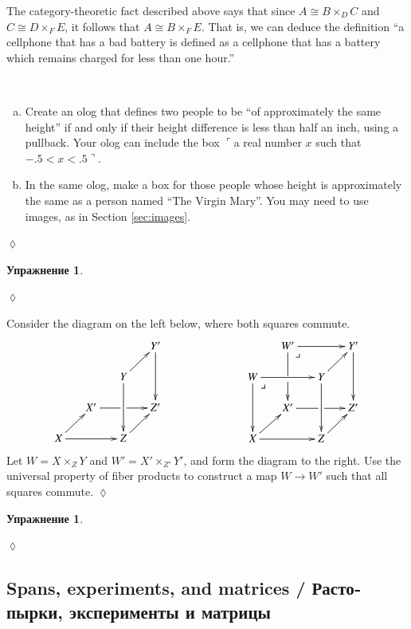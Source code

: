 \documentclass[a4paper]{book}
\makeatletter
\def\tn{\textnormal}
\def\to{\rightarrow}
\def\iso{\cong}
\newcommand{\fakebox}[1]{\tn{$\ulcorner$#1$\urcorner$}}
\def\ullimit{\ar@{}[rd]|(.3)*+{\lrcorner}}
\theoremstyle{myth}
\newtheorem{excENG}[envENG]{\begin{english}Exercise\end{english}}
\newenvironment{exerciseENG}{\begin{excENG}}{\hspace*{\fill}$\lozenge$\end{excENG}}
\newtheorem{excRUS}[envRUS]{Упражнение}
\newenvironment{exerciseRUS}{\begin{excRUS}}{\hspace*{\fill}$\lozenge$\end{excRUS}}
\def\sexc{\begin{enumerate}[a.)]\setlength{\itemsep}{.1cm}\setlength{\parskip}{.1cm}\item}
\def\next{\item}
\def\endsexc{\end{enumerate}}
\makeatother
\begin{document}
\begin{russian}
 

The category-theoretic fact described above says that since $A\iso B\times_DC$ and $C\iso D\times_FE$, it follows that $A\iso B\times_FE$.  That is, we can deduce the definition “a cellphone that has a bad battery is defined as a cellphone that has a battery which remains charged for less than one hour.”  

 

\begin{exerciseENG}~
\sexc Create an olog that defines two people to be “of approximately the same height” if and only if their height difference is less than half an inch, using a pullback. Your olog can include the box \fakebox{a real number $x$ such that $-.5<x<.5$}. 
\next In the same olog, make a box for those people whose height is approximately the same as a person named “The Virgin Mary”. You may need to use images, as in Section \ref{sec:images}.
\endsexc
\end{exerciseENG}

\begin{exerciseRUS}~
 
\end{exerciseRUS}

\begin{exerciseENG}\label{exc:pointwise map of fp}
Consider the diagram on the left below, where both squares commute. 
$$
\xymatrix@=15pt{
&&&Y'\ar[dd]\\
&&Y\ar[ru]\ar[dd]\\
&X'\ar'[r][rr]&&Z'\\
X\ar[rr]\ar[ru]&&Z\ar[ru]
}
\hspace{1in}
\xymatrix@=15pt{
&W'\ar[rr]\ar'[d][dd]\ullimit&&Y'\ar[dd]\\
W\ar[rr]\ar[dd]\ullimit&&Y\ar[ru]\ar[dd]\\
&X'\ar'[r][rr]&&Z'\\
X\ar[rr]\ar[ru]&&Z\ar[ru]
}
$$
Let $W=X\times_ZY$ and $W'=X'\times_{Z'}Y'$, and form the diagram to the right. Use the universal property of fiber products to construct a map $W\to W'$ such that all squares commute.
\end{exerciseENG}

\begin{exerciseRUS}\label{exc:pointwise map of fp}
 
\end{exerciseRUS}


\subsection{Spans, experiments, and matrices / Растопырки, эксперименты и матрицы}


\end{russian}
\end{document}
